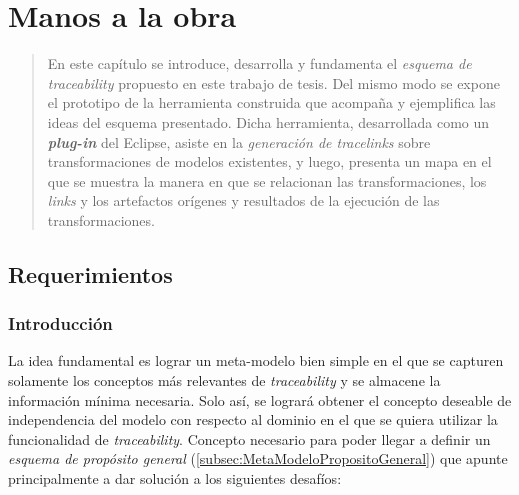 \documentclass[a4paper,12pt,oneside,spanish]{book}
\begin{document}
\chapter{Manos a la obra}
\label{cap:Propuesta}

\begin{quotation}
En este capítulo se introduce, desarrolla y fundamenta el \textit{esquema de
traceability} propuesto en este trabajo de tesis. Del mismo modo se expone el prototipo de la herramienta construida que acompaña y ejemplifica las ideas del esquema presentado. Dicha herramienta, desarrollada como un \textit{\textbf{plug-in}} del  \textsf{Eclipse}, asiste en la \textit{generación de tracelinks} sobre transformaciones de modelos existentes, y luego, presenta un mapa en el que se muestra la manera en que se relacionan las transformaciones, los \textit{links} y los artefactos orígenes y resultados de la ejecución de las transformaciones.
\end{quotation}


\bigskip


\minitoc 


\pagebreak


\section{Requerimientos}


\subsection{Introducción}
\label{sec:EsquemaPropIntro}

La idea fundamental es lograr un meta-modelo bien simple en el que se capturen solamente los conceptos más relevantes de \textit{traceability} y se almacene la información mínima necesaria. Solo así, se logrará obtener el concepto deseable de independencia del modelo con respecto al dominio en el que se quiera utilizar la funcionalidad de \textit{traceability}. Concepto necesario para poder llegar a definir un \textit{esquema de propósito general} (\ref{subsec:MetaModeloPropositoGeneral}) que apunte principalmente a dar solución a los siguientes desafíos:
\end{document}
